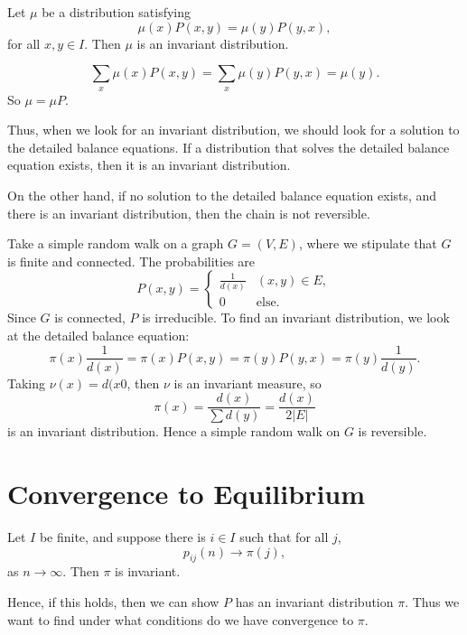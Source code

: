 \documentclass[12pt]{article}
\begin{document}
\begin{lemma}
	Let $\mu$ be a distribution satisfying
	\[
		\mu(x) P(x, y) = \mu(y) P(y, x)
	,\]
	for all $x, y \in I$. Then $\mu$ is an invariant distribution.
\end{lemma}

\begin{proofbox}
	\[
		\sum_{x} \mu(x)P(x, y) = \sum_{x} \mu(y) P(y, x) = \mu(y)
	.\]
	So $\mu = \mu P$.
\end{proofbox}

Thus, when we look for an invariant distribution, we should look for a solution to the detailed balance equations. If a distribution that solves the detailed balance equation exists, then it is an invariant distribution.

On the other hand, if no solution to the detailed balance equation exists, and there is an invariant distribution, then the chain is not reversible.

\begin{exbox}
	Take a simple random walk on a graph $G = (V, E)$, where we stipulate that $G$ is finite and connected. The probabilities are
	\[
		P(x, y) =
		\begin{cases}
			\frac{1}{d(x)} & (x, y) \in E, \\
			0 & \text{else}.
		\end{cases}
	\]
	Since $G$ is connected, $P$ is irreducible. To find an invariant distribution, we look at the detailed balance equation:
	\[
		\pi(x) \frac{1}{d(x)} = \pi(x) P(x, y) = \pi(y) P(y, x) = \pi(y) \frac{1}{d(y)}
	.\]
	Taking $\nu(x) = d(x0$, then $\nu$ is an invariant measure, so
	\[
		\pi(x) = \frac{d(x)}{\sum d(y)} = \frac{d(x)}{2|E|}
	\]
	is an invariant distribution. Hence a simple random walk on $G$ is reversible.
\end{exbox}

\newpage

\section{Convergence to Equilibrium}%
\label{sec:convergence_to_equilibrium}

\begin{theorem}
	Let $I$ be finite, and suppose there is $i \in I$ such that for all $j$,
	\[
		p_{ij}(n) \to \pi(j)
	,\]
	as $n \to \infty$. Then $\pi$ is invariant.
\end{theorem}

Hence, if this holds, then we can show $P$ has an invariant distribution $\pi$. Thus we want to find under what conditions do we have convergence to $\pi$.
\end{document}
